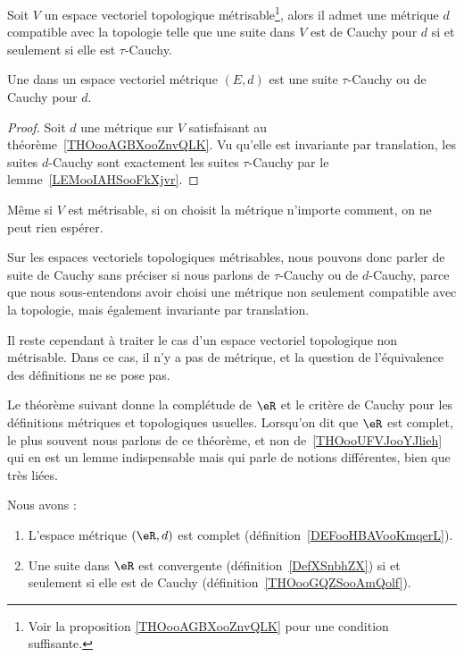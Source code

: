 \begin{theoremDef}     \label{THOooGQZSooAmQolf}
	Soit \( V\) un espace vectoriel topologique métrisable\footnote{Voir la proposition \ref{THOooAGBXooZnvQLK} pour une condition suffisante.}, alors il admet une métrique \( d\) compatible avec la topologie telle que une suite dans \( V\) est de Cauchy pour \( d\) si et seulement si elle est \( \tau\)-Cauchy.

	Une  dans un espace vectoriel métrique \( (E,d)\) est une suite \( \tau\)-Cauchy ou de Cauchy pour \( d \).
\end{theoremDef}

\begin{proof}
	Soit \( d\) une métrique sur \( V\) satisfaisant au théorème~\ref{THOooAGBXooZnvQLK}. Vu qu'elle est invariante par translation, les suites \( d\)-Cauchy sont exactement les suites \( \tau\)-Cauchy par le lemme~\ref{LEMooIAHSooFkXjvr}.
\end{proof}

\begin{remark}  \label{REMooUFQYooUVCCjs}
	Même si \( V\) est métrisable, si on choisit la métrique n'importe comment, on ne peut rien espérer.
\end{remark}

\begin{normaltext}
	Sur les espaces vectoriels topologiques métrisables, nous pouvons donc parler de suite de Cauchy sans préciser si nous parlons de \( \tau\)-Cauchy ou de \( d\)-Cauchy, parce que nous sous-entendons avoir choisi une métrique non seulement compatible avec la topologie, mais également invariante par translation.

	Il reste cependant à traiter le cas d'un espace vectoriel topologique non métrisable. Dans ce cas, il n'y a pas de métrique, et la question de l'équivalence des définitions ne se pose pas.
\end{normaltext}

Le théorème suivant donne la complétude de \( \eR\) et le critère de Cauchy pour les définitions métriques et topologiques usuelles. Lorsqu'on dit que \( \eR\) est complet, le plus souvent nous parlons de ce théorème, et non de~\ref{THOooUFVJooYJlieh} qui en est un lemme indispensable mais qui parle de notions différentes, bien que très liées.
\begin{theorem}       \label{THOooNULFooYUqQYo}
	Nous avons :
	\begin{enumerate}
		\item
		      L'espace métrique \( (\eR,d)\) est complet (définition~\ref{DEFooHBAVooKmqerL}).
		\item       \label{ITEMooUUFCooIVtGgz}
		      Une suite dans \( \eR\) est convergente (définition~\ref{DefXSnbhZX}) si et seulement si elle est de Cauchy (définition~\ref{THOooGQZSooAmQolf}).
	\end{enumerate}
\end{theorem}

